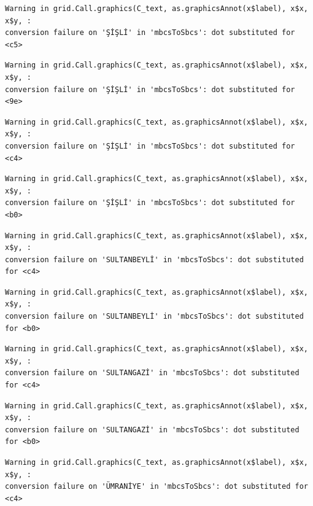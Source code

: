 \documentclass[
  11pt,
  a4paper,
  DIV=11,
  numbers=noendperiod]{scrartcl}
\begin{document}
\begin{verbatim}
Warning in grid.Call.graphics(C_text, as.graphicsAnnot(x$label), x$x, x$y, :
conversion failure on 'ŞİŞLİ' in 'mbcsToSbcs': dot substituted for <c5>
\end{verbatim}

\begin{verbatim}
Warning in grid.Call.graphics(C_text, as.graphicsAnnot(x$label), x$x, x$y, :
conversion failure on 'ŞİŞLİ' in 'mbcsToSbcs': dot substituted for <9e>
\end{verbatim}

\begin{verbatim}
Warning in grid.Call.graphics(C_text, as.graphicsAnnot(x$label), x$x, x$y, :
conversion failure on 'ŞİŞLİ' in 'mbcsToSbcs': dot substituted for <c4>
\end{verbatim}

\begin{verbatim}
Warning in grid.Call.graphics(C_text, as.graphicsAnnot(x$label), x$x, x$y, :
conversion failure on 'ŞİŞLİ' in 'mbcsToSbcs': dot substituted for <b0>
\end{verbatim}

\begin{verbatim}
Warning in grid.Call.graphics(C_text, as.graphicsAnnot(x$label), x$x, x$y, :
conversion failure on 'SULTANBEYLİ' in 'mbcsToSbcs': dot substituted for <c4>
\end{verbatim}

\begin{verbatim}
Warning in grid.Call.graphics(C_text, as.graphicsAnnot(x$label), x$x, x$y, :
conversion failure on 'SULTANBEYLİ' in 'mbcsToSbcs': dot substituted for <b0>
\end{verbatim}

\begin{verbatim}
Warning in grid.Call.graphics(C_text, as.graphicsAnnot(x$label), x$x, x$y, :
conversion failure on 'SULTANGAZİ' in 'mbcsToSbcs': dot substituted for <c4>
\end{verbatim}

\begin{verbatim}
Warning in grid.Call.graphics(C_text, as.graphicsAnnot(x$label), x$x, x$y, :
conversion failure on 'SULTANGAZİ' in 'mbcsToSbcs': dot substituted for <b0>
\end{verbatim}

\begin{verbatim}
Warning in grid.Call.graphics(C_text, as.graphicsAnnot(x$label), x$x, x$y, :
conversion failure on 'ÜMRANİYE' in 'mbcsToSbcs': dot substituted for <c4>
\end{verbatim}
\end{document}
